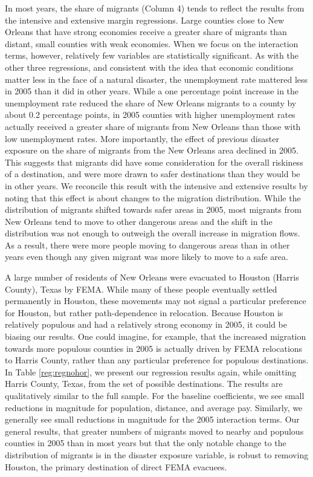 \documentclass[]{article}
\begin{document}
In most years, the share of migrants (Column 4) tends to reflect the
results from the intensive and extensive margin regressions. Large
counties close to New Orleans that have strong economies receive a
greater share of migrants than distant, small counties with weak
economies. When we focus on the interaction terms, however, relatively
few variables are statistically significant. As with the other three
regressions, and consistent with the idea that economic conditions
matter less in the face of a natural disaster, the unemployment rate
mattered less in 2005 than it did in other years. While a one percentage
point increase in the unemployment rate reduced the share of New Orleans
migrants to a county by about 0.2 percentage points, in 2005 counties
with higher unemployment rates actually received a greater share of
migrants from New Orleans than those with low unemployment rates. More
importantly, the effect of previous disaster exposure on the share of
migrants from the New Orleans area declined in 2005. This suggests that
migrants did have some consideration for the overall riskiness of a
destination, and were more drawn to safer destinations than they would
be in other years. We reconcile this result with the intensive and
extensive results by noting that this effect is about changes to the
migration distribution. While the distribution of migrants shifted
towards safer areas in 2005, most migrants from New Orleans tend to move
to other dangerous areas and the shift in the distribution was not
enough to outweigh the overall increase in migration flows. As a result,
there were more people moving to dangerous areas than in other years
even though any given migrant was more likely to move to a safe area.

A large number of residents of New Orleans were evacuated to Houston
(Harris County), Texas by FEMA. While many of these people eventually
settled permanently in Houston, these movements may not signal a
particular preference for Houston, but rather path-dependence in
relocation. Because Houston is relatively populous and had a relatively
strong economy in 2005, it could be biasing our results. One could
imagine, for example, that the increased migration towards more populous
counties in 2005 is actually driven by FEMA relocations to Harris
County, rather than any particular preference for populous destinations.
In Table \ref{reg:regnohor}, we present our regression results again,
while omitting Harris County, Texas, from the set of possible
destinations. The results are qualitatively similar to the full sample.
For the baseline coefficients, we see small reductions in magnitude for
population, distance, and average pay. Similarly, we generally see small
reductions in magnitude for the 2005 interaction terms. Our general
results, that greater numbers of migrants moved to nearby and populous
counties in 2005 than in most years but that the only notable change to
the distribution of migrants is in the disaster exposure variable, is
robust to removing Houston, the primary destination of direct FEMA
evacuees.
\end{document}
